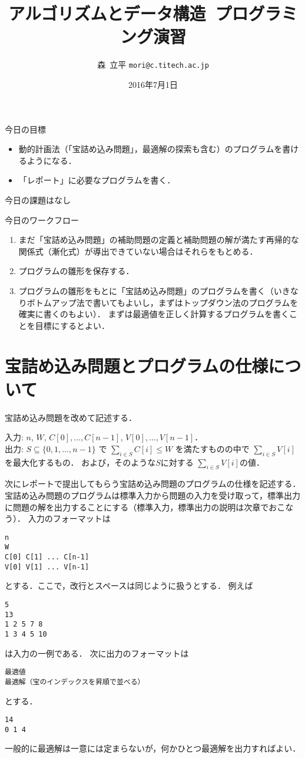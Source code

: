 \documentclass[a4paper,twoside,onecolumn,openany,article]{memoir}
\title{アルゴリズムとデータ構造~プログラミング演習}
\date{2016年7月1日}
\author{森~立平 \texttt{mori@c.titech.ac.jp}}
\theoremstyle{remark}
\begin{document}
\maketitle

\noindent
今日の目標
\begin{itemize}
\item 動的計画法（「宝詰め込み問題」，最適解の探索も含む）のプログラムを書けるようになる．
\item 「レポート」に必要なプログラムを書く．
\end{itemize}

\noindent
今日の課題はなし

\vspace{.5em}
\noindent
今日のワークフロー
\begin{enumerate}
\item まだ「宝詰め込み問題」の補助問題の定義と補助問題の解が満たす再帰的な関係式（漸化式）が導出できていない場合はそれらをもとめる．
\item プログラムの雛形を保存する．
\item プログラムの雛形をもとに「宝詰め込み問題」のプログラムを書く（いきなりボトムアップ法で書いてもよいし，まずはトップダウン法のプログラムを確実に書くのもよい）．
まずは最適値を正しく計算するプログラムを書くことを目標にするとよい．
\end{enumerate}

\section{宝詰め込み問題とプログラムの仕様について}
宝詰め込み問題を改めて記述する．

\vspace{.5em}
\noindent
入力: $n$, $W$, $C[0],\dotsc, C[n-1]$, $V[0],\dotsc,V[n-1]$．\\
出力: $S\subseteq\{0,1,\dotsc,n-1\}$ で $\sum_{i\in S} C[i] \le W$ を満たすものの中で $\sum_{i\in S}V[i]$ を最大化するもの．
および，そのような$S$に対する $\sum_{i\in S} V[i]$の値．

\vspace{.5em}

次にレポートで提出してもらう宝詰め込み問題のプログラムの仕様を記述する．
宝詰め込み問題のプログラムは標準入力から問題の入力を受け取って，標準出力に問題の解を出力することにする（標準入力，標準出力の説明は次章でおこなう）．
入力のフォーマットは
\begin{verbatim}
n
W
C[0] C[1] ... C[n-1]
V[0] V[1] ... V[n-1]
\end{verbatim}
とする．ここで，改行とスペースは同じように扱うとする．
例えば
\begin{verbatim}
5
13
1 2 5 7 8
1 3 4 5 10
\end{verbatim}
は入力の一例である．
次に出力のフォーマットは
\begin{verbatim}
最適値
最適解（宝のインデックスを昇順で並べる）
\end{verbatim}
とする．
\begin{verbatim}
14
0 1 4
\end{verbatim}
一般的に最適解は一意には定まらないが，何かひとつ最適解を出力すればよい．
\end{document}
